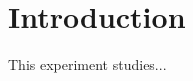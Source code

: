 \documentclass{config/base}
\begin{document}
    

\section{Introduction}
This experiment studies...
\end{document}
